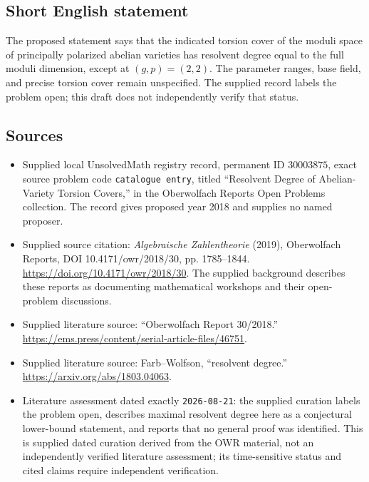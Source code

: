 \documentclass[11pt]{article}
\begin{document}
\subsection{Short English statement}
The proposed statement says that the indicated torsion cover of the moduli space of principally polarized abelian varieties has resolvent degree equal to the full moduli dimension, except at \((g,p)=(2,2)\). The parameter ranges, base field, and precise torsion cover remain unspecified. The supplied record labels the problem open; this draft does not independently verify that status.
\subsection{Sources}
\begin{itemize}
\item Supplied local UnsolvedMath registry record, permanent ID \(30003875\), exact source problem code \texttt{catalogue entry}, titled ``Resolvent Degree of Abelian-Variety Torsion Covers,'' in the Oberwolfach Reports Open Problems collection. The record gives proposed year 2018 and supplies no named proposer.
\item Supplied source citation: \emph{Algebraische Zahlentheorie} (2019), Oberwolfach Reports, DOI 10.4171/owr/2018/30, pp. 1785--1844. \url{https://doi.org/10.4171/owr/2018/30}. The supplied background describes these reports as documenting mathematical workshops and their open-problem discussions.
\item Supplied literature source: ``Oberwolfach Report 30/2018.'' \url{https://ems.press/content/serial-article-files/46751}.
\item Supplied literature source: Farb--Wolfson, ``resolvent degree.'' \url{https://arxiv.org/abs/1803.04063}.
\item Literature assessment dated exactly \texttt{2026-08-21}: the supplied curation labels the problem open, describes maximal resolvent degree here as a conjectural lower-bound statement, and reports that no general proof was identified. This is supplied dated curation derived from the OWR material, not an independently verified literature assessment; its time-sensitive status and cited claims require independent verification.
\end{itemize}
\end{document}
